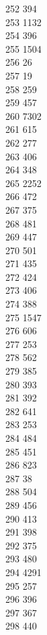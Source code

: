{ 252	394 \\
 253	1132 \\
 254	396 \\
 255	1504 \\
 256	26 \\
 257	19 \\
 258	259 \\
 259	457 \\
 260	7302 \\
 261	615 \\
 262	277 \\
 263	406 \\
 264	348 \\
 265	2252 \\
 266	472 \\
 267	375 \\
 268	481 \\
 269	447 \\
 270	501 \\
 271	435 \\
 272	424 \\
 273	406 \\
 274	388 \\
 275	1547 \\
 276	606 \\
 277	253 \\
 278	562 \\
 279	385 \\
 280	393 \\
 281	392 \\
 282	641 \\
 283	253 \\
 284	484 \\
 285	451 \\
 286	823 \\
 287	38 \\
 288	504 \\
 289	456 \\
 290	413 \\
 291	398 \\
 292	375 \\
 293	480 \\
 294	4291 \\
 295	257 \\
 296	396 \\
 297	367 \\
 298	440 \\
}
